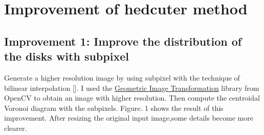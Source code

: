 \documentclass[11pt]{article}
\begin{document}
\section{Improvement of hedcuter method}
\subsection{Improvement 1: Improve the distribution of the disks with subpixel}
Generate a higher resolution image by using subpixel with the technique of bilinear interpolation []. I used the \href{https://docs.opencv.org/2.4/modules/imgproc/doc/geometric_transformations.html}{Geometric Image Transformation} library from OpenCV to obtain an image with higher resolution. Then compute the centroidal Voronoi diagram with the subpixels. Figure. 1 shows the result of this improvement. After resizing the original input image,some details become more clearer. 
\end{document}
